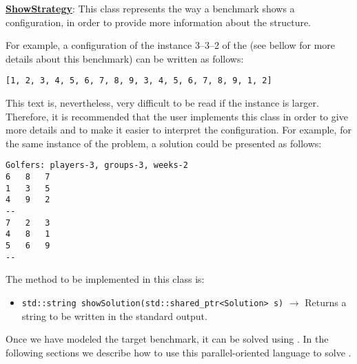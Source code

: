 \underline{\textbf{ShowStrategy}}: This class represents the way a benchmark shows a configuration, in order to provide more information about the structure. 

For example, a configuration of the instance 3--3--2 of the \sgp{} (see bellow for more details about this benchmark) can be written as follows:

\begin{Verbatim}
[1, 2, 3, 4, 5, 6, 7, 8, 9, 3, 4, 5, 6, 7, 8, 9, 1, 2]
\end{Verbatim}

This text is, nevertheless, very difficult to be read if the instance is larger. Therefore, it is recommended that the user implements this class in order to give more details and to make it easier to interpret the configuration. For example, for the same instance of the problem, a solution could be presented as follows:

\begin{Verbatim}
Golfers: players-3, groups-3, weeks-2
6	8	7	
1	3	5	
4	9	2	
--
7	2	3	
4	8	1	
5	6	9	
--
\end{Verbatim}

The method to be implemented in this class is:

\begin{itemize}
\item \verb!std::string showSolution(std::shared_ptr<Solution> s)! $\rightarrow$ Returns a string to be written in the standard output.
\end{itemize}

Once we have modeled the target benchmark, it can be solved using \posl{}. In the following sections we describe how to use this parallel-oriented language to solve \CSPs.